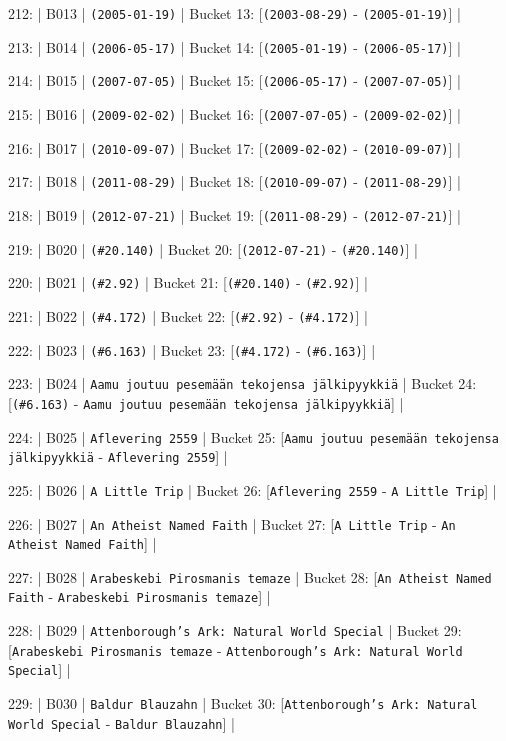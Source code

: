 \documentclass[11pt,a4paper]{article}
\begin{document}
212: | B013 | \texttt{(2005-01-19)} | Bucket 13: [\texttt{(2003-08-29)} - \texttt{(2005-01-19)}] |

213: | B014 | \texttt{(2006-05-17)} | Bucket 14: [\texttt{(2005-01-19)} - \texttt{(2006-05-17)}] |

214: | B015 | \texttt{(2007-07-05)} | Bucket 15: [\texttt{(2006-05-17)} - \texttt{(2007-07-05)}] |

215: | B016 | \texttt{(2009-02-02)} | Bucket 16: [\texttt{(2007-07-05)} - \texttt{(2009-02-02)}] |

216: | B017 | \texttt{(2010-09-07)} | Bucket 17: [\texttt{(2009-02-02)} - \texttt{(2010-09-07)}] |

217: | B018 | \texttt{(2011-08-29)} | Bucket 18: [\texttt{(2010-09-07)} - \texttt{(2011-08-29)}] |

218: | B019 | \texttt{(2012-07-21)} | Bucket 19: [\texttt{(2011-08-29)} - \texttt{(2012-07-21)}] |

219: | B020 | \texttt{(\#20.140)} | Bucket 20: [\texttt{(2012-07-21)} - \texttt{(\#20.140)}] |

220: | B021 | \texttt{(\#2.92)} | Bucket 21: [\texttt{(\#20.140)} - \texttt{(\#2.92)}] |

221: | B022 | \texttt{(\#4.172)} | Bucket 22: [\texttt{(\#2.92)} - \texttt{(\#4.172)}] |

222: | B023 | \texttt{(\#6.163)} | Bucket 23: [\texttt{(\#4.172)} - \texttt{(\#6.163)}] |

223: | B024 | \texttt{Aamu joutuu pesemään tekojensa jälkipyykkiä} | Bucket 24: [\texttt{(\#6.163)} - \texttt{Aamu joutuu pesemään tekojensa jälkipyykkiä}] |

224: | B025 | \texttt{Aflevering 2559} | Bucket 25: [\texttt{Aamu joutuu pesemään tekojensa jälkipyykkiä} - \texttt{Aflevering 2559}] |

225: | B026 | \texttt{A Little Trip} | Bucket 26: [\texttt{Aflevering 2559} - \texttt{A Little Trip}] |

226: | B027 | \texttt{An Atheist Named Faith} | Bucket 27: [\texttt{A Little Trip} - \texttt{An Atheist Named Faith}] |

227: | B028 | \texttt{Arabeskebi Pirosmanis temaze} | Bucket 28: [\texttt{An Atheist Named Faith} - \texttt{Arabeskebi Pirosmanis temaze}] |

228: | B029 | \texttt{Attenborough's Ark: Natural World Special} | Bucket 29: [\texttt{Arabeskebi Pirosmanis temaze} - \texttt{Attenborough's Ark: Natural World Special}] |

229: | B030 | \texttt{Baldur Blauzahn} | Bucket 30: [\texttt{Attenborough's Ark: Natural World Special} - \texttt{Baldur Blauzahn}] |
\end{document}
